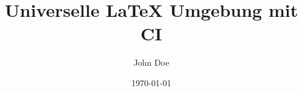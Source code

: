 
\usepackage[ngerman]{babel}
\usepackage{blindtext}

\title{Universelle LaTeX Umgebung mit CI}
\author{John Doe}
\date{\today%
}